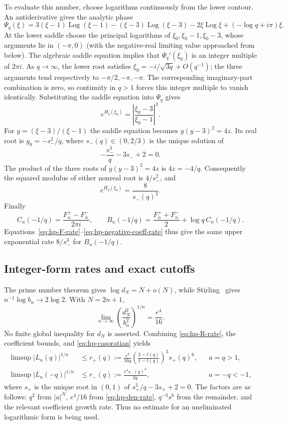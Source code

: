 To evaluate this number, choose logarithms continuously from the lower
contour.  An antiderivative gives the analytic phase
\[
 \Psi_q(\xi)=3(\xi-1)\operatorname{Log}(\xi-1)- (\xi-3)\operatorname{Log}(\xi-3)
             -2\xi\operatorname{Log}\xi+(-\log q+i\pi)\xi.
\]
At the lower saddle choose the principal logarithms of
$\xi_0,\xi_0-1,\xi_0-3$, whose arguments lie in $(-\pi,0)$ (with the
negative-real limiting value approached from below).  The algebraic saddle
equation implies that $\Psi_q'(\xi_0)$ is an integer multiple of $2\pi i$.
As $q\to\infty$, the lower root satisfies
$\xi_0=-i/\sqrt{3q}+O(q^{-1})$; the three arguments tend respectively to
$-\pi/2,-\pi,-\pi$.  The corresponding imaginary-part combination is zero,
so continuity in $q>1$ forces this integer multiple to vanish identically.
Substituting the saddle equation into $\Psi_q$ gives
\[
 e^{H_q(\xi_0)}=\left|\frac{\xi_0-3}{\xi_0-1}\right|^3.
\]
For $y=(\xi-3)/(\xi-1)$ the saddle equation becomes
$y(y-3)^2=4z$.  Its real root is $y_0=-s_-^2/q$, where
$s_-(q)\in(0,2/3)$ is the unique solution of
\begin{equation}\label{eq:hp-sminus}
 -\frac{s_-^3}{q}-3s_-+2=0.
\end{equation}
The product of the three roots of $y(y-3)^2=4z$ is $4z=-4/q$.
Consequently the squared modulus of either nonreal root is
$4/s_-^2$, and
\begin{equation}\label{eq:hp-negative-coeff-rate}
 e^{H_q(\xi_0)}=\frac8{s_-(q)^3}.
\end{equation}
Finally
\[
 C_n(-1/q)=\frac{F_n^+-F_n^-}{2\pi i},\qquad
 B_n(-1/q)=\frac{F_n^++F_n^-}{2}+\log q\,C_n(-1/q).
\]
Equations~\eqref{eq:hp-F-rate}--\eqref{eq:hp-negative-coeff-rate} thus give
the same upper exponential rate $8/s_-^3$ for $B_n(-1/q)$.

\subsection{Integer-form rates and exact cutoffs}
The prime number theorem gives
$\log d_N=N+o(N)$, while Stirling~\cite{WhittakerWatson} gives
$n^{-1}\log b_n\to2\log2$.  With $N=2n+1$,
\begin{equation}\label{eq:hp-den-rate}
 \lim_{n\to\infty}\left(\frac{d_N^2}{b_n^2}\right)^{1/n}
       =\frac{e^4}{16}.
\end{equation}
No finite global inequality for $d_N$ is asserted.  Combining
\eqref{eq:hp-R-rate}, the coefficient bounds, and
\eqref{eq:hp-casoratian} yields
\begin{align}
 \limsup |L_n(q)|^{1/n}&\le
 r_+(q):=\frac{e^4}{16q}
       \left(\frac{3-t(q)}{1-t(q)}\right)^3s_+(q)^6,
       &&a=q>1,\\
 \limsup |L_n(-q)|^{1/n}&\le
 r_-(q):=\frac{e^4s_-(q)^3}{2q},
       &&a=-q<-1,
\end{align}
where $s_+$ is the unique root in $(0,1)$ of
$s_+^3/q-3s_++2=0$.  The factors are as follows: $q^2$ from $|a|^N$,
$e^4/16$ from \eqref{eq:hp-den-rate}, $q^{-3}s^6$ from the remainder,
and the relevant coefficient growth rate.  Thus no estimate for an
uneliminated logarithmic form is being used.

